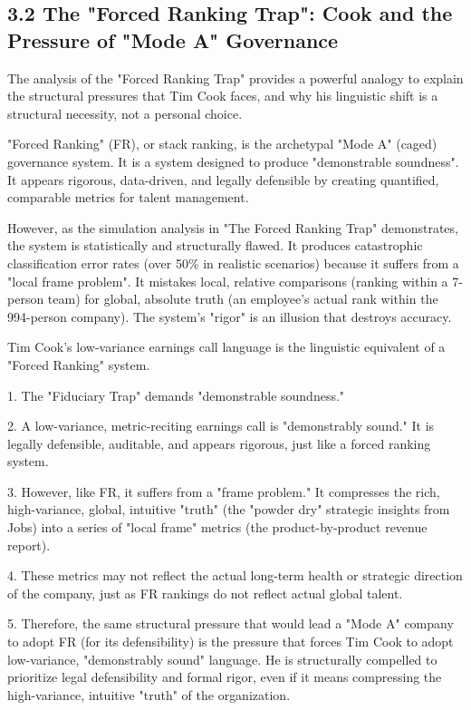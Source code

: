 \documentclass[12pt]{article}
\begin{document}
\subsection{3.2 The "Forced Ranking Trap": Cook and the Pressure of "Mode A" Governance}

The analysis of the "Forced Ranking Trap" provides a powerful analogy to explain the structural pressures that Tim Cook faces, and why his linguistic shift is a structural necessity, not a personal choice.

"Forced Ranking" (FR), or stack ranking, is the archetypal "Mode A" (caged) governance system. It is a system designed to produce "demonstrable soundness". It appears rigorous, data-driven, and legally defensible by creating quantified, comparable metrics for talent management.

However, as the simulation analysis in "The Forced Ranking Trap" demonstrates, the system is statistically and structurally flawed. It produces catastrophic classification error rates (over 50\% in realistic scenarios) because it suffers from a "local frame problem". It mistakes local, relative comparisons (ranking within a 7-person team) for global, absolute truth (an employee's actual rank within the 994-person company). The system's "rigor" is an illusion that destroys accuracy.

Tim Cook's low-variance earnings call language is the linguistic equivalent of a "Forced Ranking" system.

1. The "Fiduciary Trap" demands "demonstrable soundness."

2. A low-variance, metric-reciting earnings call is "demonstrably sound." It is legally defensible, auditable, and appears rigorous, just like a forced ranking system.

3. However, like FR, it suffers from a "frame problem." It compresses the rich, high-variance, global, intuitive "truth" (the "powder dry" strategic insights from Jobs) into a series of "local frame" metrics (the product-by-product revenue report).

4. These metrics may not reflect the actual long-term health or strategic direction of the company, just as FR rankings do not reflect actual global talent.

5. Therefore, the same structural pressure that would lead a "Mode A" company to adopt FR (for its defensibility) is the pressure that forces Tim Cook to adopt low-variance, "demonstrably sound" language. He is structurally compelled to prioritize legal defensibility and formal rigor, even if it means compressing the high-variance, intuitive "truth" of the organization.
\end{document}
